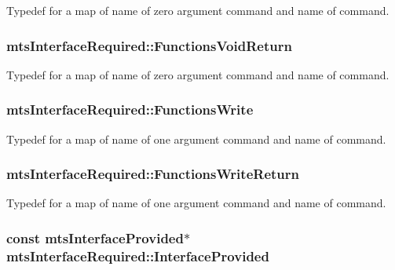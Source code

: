 Typedef for a map of name of zero argument command and name of command. \hypertarget{classmts_interface_required_a0588d79b2eca17da7ab9dfe9be6464f1}{
\subsubsection[{Functions\-Void\-Return}]{ mts\-Interface\-Required\-::\-Functions\-Void\-Return\hspace{0.3cm}{\ttfamily [protected]}}}\label{classmts_interface_required_a0588d79b2eca17da7ab9dfe9be6464f1}
Typedef for a map of name of zero argument command and name of command. \hypertarget{classmts_interface_required_af065f884f6aaac85d342b49bf6673528}{
\subsubsection[{Functions\-Write}]{ mts\-Interface\-Required\-::\-Functions\-Write\hspace{0.3cm}{\ttfamily [protected]}}}\label{classmts_interface_required_af065f884f6aaac85d342b49bf6673528}
Typedef for a map of name of one argument command and name of command. \hypertarget{classmts_interface_required_a4ce7797bea9968322e404e09a289196f}{
\subsubsection[{Functions\-Write\-Return}]{ mts\-Interface\-Required\-::\-Functions\-Write\-Return\hspace{0.3cm}{\ttfamily [protected]}}}\label{classmts_interface_required_a4ce7797bea9968322e404e09a289196f}
Typedef for a map of name of one argument command and name of command. \hypertarget{classmts_interface_required_a9c35d946a1e0308d32495e94ba90978e}{
\subsubsection[{Interface\-Provided}]{\setlength{\rightskip}{0pt plus 5cm}const {\bf mts\-Interface\-Provided}$\ast$ mts\-Interface\-Required\-::\-Interface\-Provided\hspace{0.3cm}{\ttfamily [protected]}}}\label{classmts_interface_required_a9c35d946a1e0308d32495e94ba90978e}
